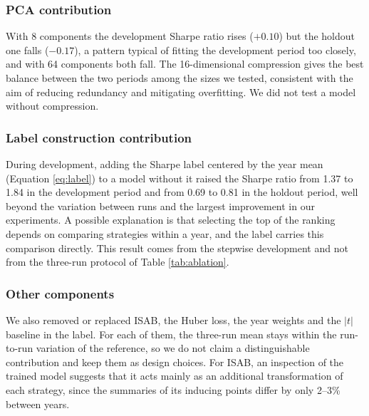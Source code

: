 \documentclass[pdflatex,sn-mathphys-num]{sn-jnl}%
\theoremstyle{thmstyleone}%
\theoremstyle{thmstyletwo}%
\theoremstyle{thmstylethree}%
\begin{document}
\subsubsection{PCA contribution}
With 8 components the development Sharpe ratio rises ($+0.10$) but the holdout one falls ($-0.17$), a pattern typical of fitting the development period too closely, and with 64 components both fall. The 16-dimensional compression gives the best balance between the two periods among the sizes we tested, consistent with the aim of reducing redundancy and mitigating overfitting. We did not test a model without compression.

\subsubsection{Label construction contribution}
During development, adding the Sharpe label centered by the year mean (Equation \eqref{eq:label}) to a model without it raised the Sharpe ratio from 1.37 to 1.84 in the development period and from 0.69 to 0.81 in the holdout period, well beyond the variation between runs and the largest improvement in our experiments. A possible explanation is that selecting the top of the ranking depends on comparing strategies within a year, and the label carries this comparison directly. This result comes from the stepwise development and not from the three-run protocol of Table \ref{tab:ablation}.

\subsubsection{Other components}
We also removed or replaced ISAB, the Huber loss, the year weights and the $|t|$ baseline in the label. For each of them, the three-run mean stays within the run-to-run variation of the reference, so we do not claim a distinguishable contribution and keep them as design choices. For ISAB, an inspection of the trained model suggests that it acts mainly as an additional transformation of each strategy, since the summaries of its inducing points differ by only 2--3\% between years.


\end{document}
